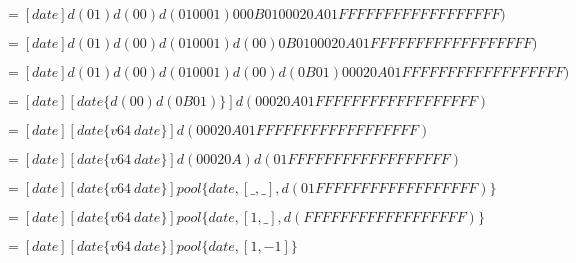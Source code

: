 $=[date] d(01) d(00) d(01 00 01) 00  0B 01 00 02  0A 01 FF FF  FF FF FF FF  FF FF FF)$

$=[date] d(01) d(00) d(01 00 01) d(00) 0B 01 00 02  0A 01 FF FF  FF FF FF FF  FF FF FF)$

$=[date] d(01) d(00) d(01 00 01) d(00) d(0B 01) 00 02  0A 01 FF FF  FF FF FF FF  FF FF FF)$

$=[date] [date \{d(00) d(0B 01)\}] d(00 02 0A 01 FF FF  FF FF FF FF  FF FF FF)$

$=[date] [date \{v64\ date\}] d(00 02 0A 01 FF FF  FF FF FF FF  FF FF FF)$

$=[date] [date \{v64\ date\}] d(00 02 0A) d(01 FF FF  FF FF FF FF  FF FF FF)$

$=[date] [date \{v64\ date\}] pool\{date, [\_,\_], d(01 FF FF  FF FF FF FF  FF FF FF)\}$

$=[date] [date \{v64\ date\}] pool\{date, [1,\_], d(FF FF  FF FF FF FF  FF FF FF)\}$

$=[date] [date \{v64\ date\}] pool\{date, [1,-1]\}$
